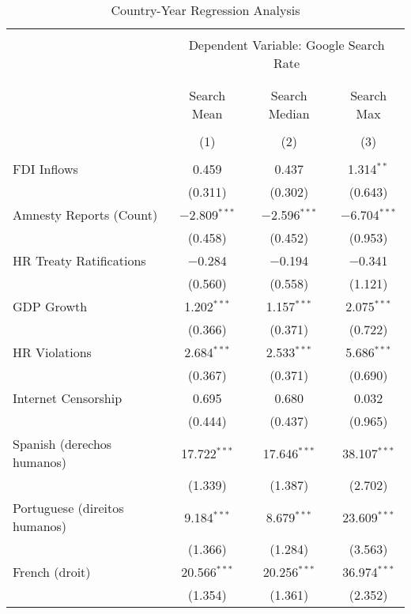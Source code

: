 
\begin{table}[!htbp] \centering 
  \caption{Country-Year Regression Analysis} 
  \label{} 
\begin{tabular}{@{\extracolsep{5pt}}lccc} 
\\[-1.8ex]\hline 
\hline \\[-1.8ex] 
 & \multicolumn{3}{c}{Dependent Variable: Google Search Rate} \\ 
\cline{2-4} 
\\[-1.8ex] & \multicolumn{3}{c}{ } \\ 
 & Search Mean & Search Median & Search Max \\ 
\\[-1.8ex] & (1) & (2) & (3)\\ 
\hline \\[-1.8ex] 
 FDI Inflows & 0.459 & 0.437 & 1.314$^{**}$ \\ 
  & (0.311) & (0.302) & (0.643) \\ 
  Amnesty Reports (Count) & $-$2.809$^{***}$ & $-$2.596$^{***}$ & $-$6.704$^{***}$ \\ 
  & (0.458) & (0.452) & (0.953) \\ 
  HR Treaty Ratifications & $-$0.284 & $-$0.194 & $-$0.341 \\ 
  & (0.560) & (0.558) & (1.121) \\ 
  GDP Growth & 1.202$^{***}$ & 1.157$^{***}$ & 2.075$^{***}$ \\ 
  & (0.366) & (0.371) & (0.722) \\ 
  HR Violations & 2.684$^{***}$ & 2.533$^{***}$ & 5.686$^{***}$ \\ 
  & (0.367) & (0.371) & (0.690) \\ 
  Internet Censorship & 0.695 & 0.680 & 0.032 \\ 
  & (0.444) & (0.437) & (0.965) \\ 
  Spanish (derechos humanos) & 17.722$^{***}$ & 17.646$^{***}$ & 38.107$^{***}$ \\ 
  & (1.339) & (1.387) & (2.702) \\ 
  Portuguese (direitos humanos) & 9.184$^{***}$ & 8.679$^{***}$ & 23.609$^{***}$ \\ 
  & (1.366) & (1.284) & (3.563) \\ 
  French (droit) & 20.566$^{***}$ & 20.256$^{***}$ & 36.974$^{***}$ \\ 
  & (1.354) & (1.361) & (2.352) \\ 

\end{tabular}
\end{table}
